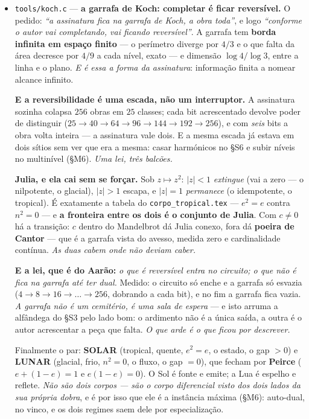 \documentclass[11pt]{article}
\newcommand{\code}[1]{\texttt{\small #1}}
\theoremstyle{plain}
\theoremstyle{remark}
\begin{document}
\begin{itemize}
\item \code{tools/koch.c} --- \textbf{a garrafa de Koch: completar é ficar reversível.} O pedido: \emph{``a assinatura fica na garrafa de Koch, a obra toda''}, e logo \emph{``conforme o autor vai
completando, vai ficando reversível''}. A garrafa tem \textbf{borda infinita em espaço finito} --- o
perímetro diverge por $4/3$ e o que falta da área decresce por $4/9$ a cada nível, exato --- e
dimensão $\log4/\log3$, entre a linha e o plano. \emph{E é essa a forma da assinatura}: informação
finita a nomear alcance infinito.

\textbf{E a reversibilidade é uma escada, não um interruptor.} A assinatura sozinha colapsa $256$
obras em $25$ classes; cada bit acrescentado devolve poder de distinguir
($25\to40\to64\to96\to144\to192\to256$), e com \emph{seis} bits a obra volta inteira --- a
assinatura vale dois. E a mesma escada já estava em dois sítios sem ver que era a mesma: casar
harmónicos no §S6 e subir níveis no multinível (§M6). \emph{Uma lei, três balcões.}

\textbf{Julia, e ela cai sem se forçar.} Sob $z\mapsto z^2$: $|z|<1$ \emph{extingue} (vai a zero ---
o nilpotente, o glacial), $|z|>1$ escapa, e $|z|=1$ \emph{permanece} (o idempotente, o tropical). É
exatamente a tabela do \code{corpo\_tropical.tex} --- $e^2=e$ contra $n^2=0$ --- e \textbf{a
fronteira entre os dois é o conjunto de Julia}. Com $c\ne0$ há a transição: $c$ dentro do Mandelbrot
dá Julia conexo, fora dá \textbf{poeira de Cantor} --- que é a garrafa vista do avesso, medida zero
e cardinalidade contínua. \emph{As duas cabem onde não deviam caber.}

\textbf{E a lei, que é do Aarão:} \emph{o que é reversível entra no circuito; o que não é fica na
garrafa até ter dual.} Medido: o circuito só enche e a garrafa só esvazia ($4\to8\to16\to\dots\to
256$, dobrando a cada bit), e no fim a garrafa fica vazia. \emph{A garrafa não é um cemitério, é uma
sala de espera} --- e isto arruma a alfândega do §S3 pelo lado bom: o ardimento não é a única saída,
a outra é o autor acrescentar a peça que falta. \emph{O que arde é o que ficou por descrever.}

Finalmente o par: \textbf{SOLAR} (tropical, quente, $e^2=e$, o estado, o gap $>0$) e \textbf{LUNAR}
(glacial, frio, $n^2=0$, o fluxo, o gap $=0$), que fecham por \textbf{Peirce} ($e+(1-e)=1$ e
$e(1-e)=0$). O Sol é fonte e emite; a Lua é espelho e reflete. \emph{Não são dois corpos --- são o
corpo diferencial visto dos dois lados da sua própria dobra}, e é por isso que ele é a instância
máxima (§M6): auto-dual, no vinco, e os dois regimes saem dele por especialização.


\end{itemize}
\end{document}

